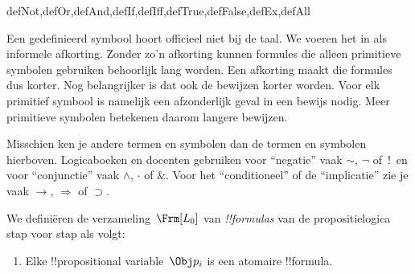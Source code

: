\documentclass[openany]{memoir}
\begin{document}
\begin{tagblock}{defNot,defOr,defAnd,defIf,defIff,defTrue,defFalse,defEx,defAll}
\begin{explain}
Een gedefinieerd symbool hoort officieel niet bij de taal. We voeren
het in als informele afkorting. Zonder zo'n afkorting kunnen formules
die alleen primitieve symbolen gebruiken behoorlijk lang worden. Een
afkorting maakt die formules dus korter. Nog belangrijker is dat ook
de bewijzen korter worden. Voor elk primitief symbool is namelijk een
afzonderlijk geval in een bewijs nodig. Meer primitieve symbolen
betekenen daarom langere bewijzen.
\end{explain}
\end{tagblock}


\begin{intro}
Misschien ken je andere termen en symbolen dan de termen en symbolen
hierboven. Logicaboeken en docenten gebruiken voor ``negatie'' vaak
$\sim$, $\neg$ of~!\ en voor ``conjunctie'' vaak $\wedge$, $\cdot$ of
$\&$. Voor het ``conditioneel'' of de ``implicatie'' zie je vaak $\rightarrow$,
$\Rightarrow$ of $\supset$.
\end{intro}

\begin{defn}[Formule]
We definiëren de verzameling~$\Frm[L_0]$ van \emph{!!{formula}s} van
de propositielogica stap voor stap als volgt:
\begin{enumerate}


\item Elke !!{propositional variable}~$\Obj p_i$ is een atomaire
  !!{formula}.






\end{enumerate}
\end{defn}
\end{document}
